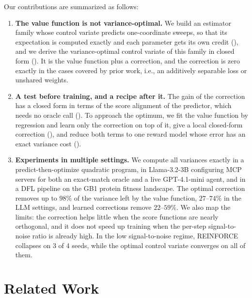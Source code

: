 \documentclass[10pt]{article}
\theoremstyle{plain}
\theoremstyle{definition}
\theoremstyle{remark}
\theoremstyle{definition}
\begin{document}
Our contributions are summarized as follows:
\begin{enumerate}[leftmargin=2em]
    \item \textbf{The value function is not variance-optimal.} We build an estimator family whose control variate predicts one-coordinate sweeps, so that its expectation is computed exactly and each parameter gets its own credit (), and we derive the variance-optimal control variate of this family in closed form (). It is the value function plus a correction, and the correction is zero exactly in the cases covered by prior work, i.e., an additively separable loss or unshared weights.
    \item \textbf{A test before training, and a recipe after it.} The gain of the correction has a closed form in terms of the score alignment of the predictor, which needs no oracle call (). To approach the optimum, we fit the value function by regression and learn only the correction on top of it, give a local closed-form correction (), and reduce both terms to one reward model whose error has an exact variance cost ().
    \item \textbf{Experiments in multiple settings.} We compute all variances exactly in a predict-then-optimize quadratic program, in Llama-3.2-3B configuring MCP servers for both an exact-match oracle and a live GPT-4.1-mini agent, and in a DFL pipeline on the GB1 protein fitness landscape. The optimal correction removes up to $98\%$ of the variance left by the value function, $27$--$74\%$ in the LLM settings, and learned corrections remove $22$--$59\%$. We also map the limits: the correction helps little when the score functions are nearly orthogonal, and it does not speed up training when the per-step signal-to-noise ratio is already high. In the low signal-to-noise regime, REINFORCE collapses on 3 of 4 seeds, while the optimal control variate converges on all of them.
\end{enumerate}

\section{Related Work}\label{sec:related}
\end{document}
